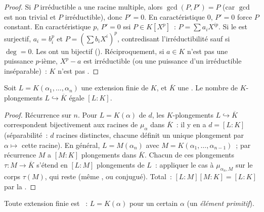 \begin{proof}
Si $P$ irréductible a une racine multiple, alors $\gcd(P, P') =
P$ (car $\gcd$ est non trivial et $P$ irréductible), donc $P'
= 0$. En caractéristique $0$, $P' = 0$ force $P$ constant. En
caractéristique $p$, $P' = 0$ ssi $P \in K[X^p]$~: $P =
\sum a_i X^{ip}$. Si le  est surjectif, $a_i = b_i^p$
et $P = (\sum b_i X^i)^p$, contredisant l'irréductibilité sauf
si $\deg = 0$. Les  ont un  bijectif (). Réciproquement, si $a \in K$ n'est pas une puissance
$p$-ième, $X^p - a$ est irréductible (ou une puissance d'un
irréductible inséparable)~: $K$ n'est pas .
\end{proof}

\begin{proposition}\label{prop:b3:galois:embeddings}
Soit $L = K(\alpha_1, \dots, \alpha_n)$ une extension finie
 de $K$, et $\overline K$ une . Le
nombre de $K$-plongements $L \hookrightarrow \overline K$ égale
$[L:K]$.
\end{proposition}

\begin{proof}
Récurrence sur $n$. Pour $L = K(\alpha)$  de  $d$,
les $K$-plongements $L \hookrightarrow \overline K$
correspondent bijectivement aux racines de $\mu_\alpha$ dans
$\overline K$~: il y en a $d = [L:K]$ (séparabilité~: $d$
racines distinctes, chacune définit un unique plongement par
$\alpha \mapsto$ cette racine). En général, $L = M(\alpha_n)$
avec $M = K(\alpha_1, \dots, \alpha_{n-1})$~; par récurrence
$M$ a $[M:K]$ plongements dans $\overline K$. Chacun de ces
plongements $\tau \colon M \to \overline K$ s'étend en
$[L:M]$ plongements de $L$~: appliquer le cas  à
$\mu_{\alpha_n, M}$ sur le corps $\tau(M)$, qui reste
 (même , ou conjugué). Total~:
$[L:M][M:K] = [L:K]$ par la .
\end{proof}

\begin{theorem}\label{thm:b3:galois:primitive}
Toute extension finie  est ~: $L = K(\alpha)$
pour un certain $\alpha$ (un \emph{élément
primitif}).
\end{theorem}

